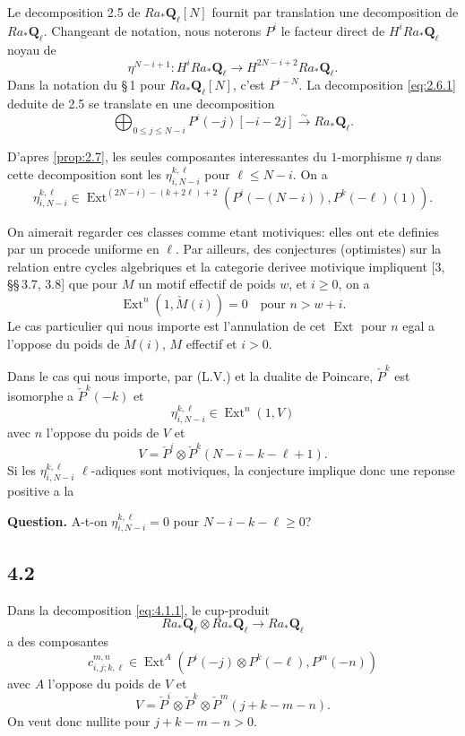 \documentclass[11pt,a4paper]{article}
\theoremstyle{plain}
\theoremstyle{definition}
\DeclareMathOperator{\Ext}{Ext}
\newcommand{\bQ}{\mathbf{Q}}
\begin{document}
Le decomposition 2.5 de $Ra_* \bQ_\ell[N]$ fournit par translation une decomposition de $Ra_* \bQ_\ell$. Changeant de notation, nous noterons $P^i$ le facteur direct de $H^i Ra_* \bQ_\ell$ noyau de
\[
\eta^{N-i+1} \colon H^i Ra_* \bQ_\ell \to H^{2N-i+2} Ra_* \bQ_\ell.
\]
Dans la notation du \S\,1 pour $Ra_* \bQ_\ell[N]$, c'est $P^{i-N}$. La decomposition \eqref{eq:2.6.1} deduite de 2.5 se translate en une decomposition
\begin{equation}\label{eq:4.1.1}
\bigoplus_{0 \leqslant j \leqslant N-i} P^i(-j)[-i-2j] \xrightarrow{\sim} Ra_* \bQ_\ell.
\end{equation}

D'apres \ref{prop:2.7}, les seules composantes interessantes du $1$-morphisme $\eta$ dans cette decomposition sont les $\eta^{k,\ell}_{i,N-i}$ pour $\ell \leqslant N-i$. On a
\[
\eta^{k,\ell}_{i,N-i} \in \Ext^{(2N-i)-(k+2\ell)+2}(P^i(-(N-i)), P^k(-\ell)(1)).
\]

On aimerait regarder ces classes comme etant motiviques: elles ont ete definies par un procede uniforme en $\ell$. Par ailleurs, des conjectures (optimistes) sur la relation entre cycles algebriques et la categorie derivee motivique impliquent [3, \S\S\,3.7, 3.8] que pour $M$ un motif effectif de poids $w$, et $i \geqslant 0$, on a
\[
\Ext^n(1, \check{M}(i)) = 0 \quad \text{pour } n > w+i.
\]
Le cas particulier qui nous importe est l'annulation de cet $\Ext$ pour $n$ egal a l'oppose du poids de $\check{M}(i)$, $M$ effectif et $i > 0$.

Dans le cas qui nous importe, par (L.V.) et la dualite de Poincare, $\check{P}^k$ est isomorphe a $\check{P}^k(-k)$ et
\[
\eta^{k,\ell}_{i,N-i} \in \Ext^n(1, V)
\]
avec $n$ l'oppose du poids de $V$ et
\[
V = \check{P}^i \otimes \check{P}^k(N-i-k-\ell+1).
\]
Si les $\eta^{k,\ell}_{i,N-i}$ $\ell$-adiques sont motiviques, la conjecture implique donc une reponse positive a la

\smallskip
\noindent\textbf{Question.} A-t-on $\eta^{k,\ell}_{i,N-i} = 0$ pour $N-i-k-\ell \geqslant 0$?
\smallskip

\subsection*{4.2}
Dans la decomposition \eqref{eq:4.1.1}, le cup-produit
\[
Ra_* \bQ_\ell \otimes Ra_* \bQ_\ell \to Ra_* \bQ_\ell
\]
a des composantes
\[
c^{m,n}_{i,j;k,\ell} \in \Ext^A(P^i(-j) \otimes P^k(-\ell), P^m(-n))
\]
avec $A$ l'oppose du poids de $V$ et
\[
V = \check{P}^i \otimes \check{P}^k \otimes \check{P}^m(j+k-m-n).
\]
On veut donc nullite pour $j+k-m-n > 0$.
\end{document}
